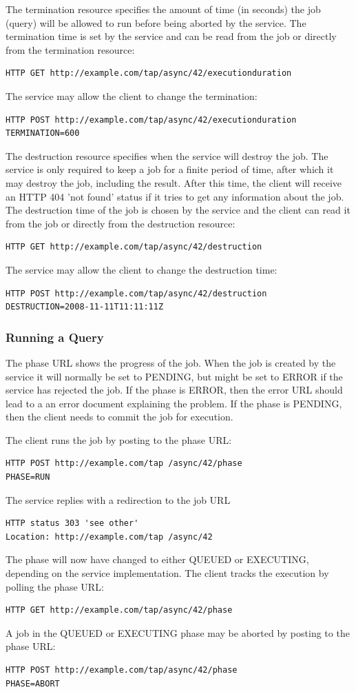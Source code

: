 \documentclass[11pt,letter]{ivoa}
\begin{document}
{The termination resource specifies the amount of time (in seconds) the job 
(query) will be allowed to run before being aborted by the service. The 
termination time is set by the service and can be read from the job or directly 
from the termination resource:

\begin{verbatim}
HTTP GET http://example.com/tap/async/42/executionduration
\end{verbatim}
The service may allow the client to change the termination:
\begin{verbatim}
HTTP POST http://example.com/tap/async/42/executionduration
TERMINATION=600
\end{verbatim}
The destruction resource specifies when the service will destroy the job. The 
service is only required to keep a job for a finite period of time, after which 
it may destroy the job, including the result. After this time, the client will 
receive an HTTP 404 'not found' status if it tries to get any information about 
the job. The destruction time of the job is chosen by the service and the client 
can read it from the job or directly from the destruction resource:
\begin{verbatim}
HTTP GET http://example.com/tap/async/42/destruction
\end{verbatim}
The service may allow the client to change the destruction time:
\begin{verbatim}
HTTP POST http://example.com/tap/async/42/destruction
DESTRUCTION=2008-11-11T11:11:11Z
\end{verbatim}

\subsubsection{Running a Query}
The phase URL shows the progress of the job. When the job is created by the 
service it will normally be set to PENDING, but might be set to ERROR if the 
service has rejected the job. If the phase is ERROR, then the error URL should 
lead to a an error document explaining the problem. If the phase is PENDING, 
then the client needs to commit the job for execution.

The client runs the job by posting to the phase URL:
\begin{verbatim}
HTTP POST http://example.com/tap /async/42/phase
PHASE=RUN
\end{verbatim}

The service replies with a redirection to the job URL
\begin{verbatim}
HTTP status 303 'see other'
Location: http://example.com/tap /async/42
\end{verbatim}
The phase will now have changed to either QUEUED or EXECUTING, depending on the 
service implementation. The client tracks the execution by polling the phase 
URL:
\begin{verbatim}
HTTP GET http://example.com/tap/async/42/phase
\end{verbatim}
A job in the  QUEUED or EXECUTING phase may be aborted by posting to the phase 
URL:
\begin{verbatim}
HTTP POST http://example.com/tap/async/42/phase
PHASE=ABORT
\end{verbatim}

}
\end{document}

